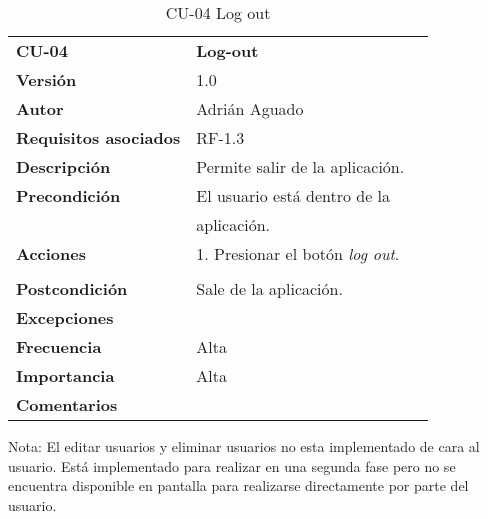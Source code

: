 \begin{table}[H]
\begin{tabular}{llr}  
\toprule
\begin{minipage}[b]{0.24\columnwidth}\raggedright\strut
\textbf{CU-04}\strut
\end{minipage} & \begin{minipage}[b]{0.72\columnwidth}\raggedright\strut
\textbf{Log-out}\strut
\end{minipage}\tabularnewline
\cmidrule(r){1-2}
\textbf{Versión}       & 1.0           \\
\textbf{Autor}       & Adrián  Aguado    \\
\textbf{Requisitos asociados}       & RF-1.3 \\ 
\textbf{Descripción} & Permite salir de la aplicación.\\
\textbf{Precondición} & El usuario está dentro de la \\
& aplicación.       \\
\textbf{Acciones} & 1. Presionar el botón \emph{log out}.\\
   \\
\textbf{Postcondición} & Sale de la aplicación.  \\
\textbf{Excepciones} &     \\
\textbf{Frecuencia} & Alta            \\
\textbf{Importancia} & Alta            \\
\textbf{Comentarios } &      \\
\bottomrule
\end{tabular}
\caption{CU-04 Log out} 
\end{table}

Nota: El editar usuarios y eliminar usuarios no esta implementado de cara al usuario. Está implementado para realizar en una segunda fase  pero no se encuentra disponible en pantalla para realizarse directamente por parte del usuario.

